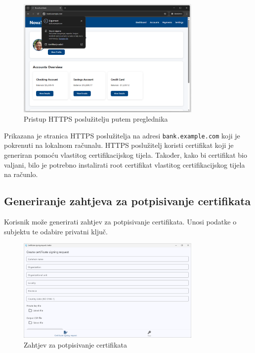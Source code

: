 \documentclass[]{foi}
\begin{document}
\begin{figure}[H]
    \centering
    \includegraphics[width=0.8\textwidth]{assets/bank.png}
    \caption{Pristup HTTPS poslužitelju putem preglednika}
\end{figure}

Prikazana je stranica HTTPS poslužitelja
na adresi \texttt{bank.example.com} koji je pokrenuti na lokalnom računalu.
HTTPS poslužitelj koristi certifikat koji je generiran
pomoću vlastitog certifikacijskog tijela. Također, kako bi certifikat
bio valjani, bilo je potrebno instalirati root certifikat vlastitog
certifikacijskog tijela na računlo.

\subsection{Generiranje zahtjeva za potpisivanje certifikata}

Korisnik može generirati zahtjev za potpisivanje certifikata.
Unosi podatke o subjektu te odabire privatni ključ.

\begin{figure}[H]
    \centering
    \includegraphics[width=0.8\textwidth]{assets/csr.png}
    \caption{Zahtjev za potpisivanje certifikata}
\end{figure}
\end{document}
